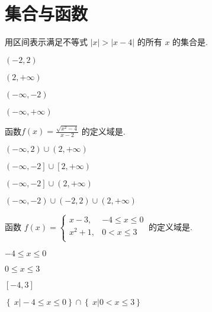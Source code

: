 \chapter{集合与函数}



\begin{problem}
	用区间表示满足不等式 $|x| > |x - 4|$ 的所有 $x$ 的集合是.
	
	
\begin{abcd} 
		\item $\left( - 2,2 \right)$
		
		\item $\left( 2, + \infty \right)$
		
		\item $\left( - \infty, - 2 \right)$
		
		\item $\left( - \infty, + \infty \right)$
\end{abcd}  
\end{problem}

\begin{problem}	
函数$\displaystyle f\left( x \right) = \frac{\sqrt{x^{2} - 4}}{x - 2}$ 的定义域是.
	
	
	\begin{abcd} \item $\left( - \infty,2 \right) \cup \left( 2, + \infty \right)$
		
		\item
		$\left( - \infty, - 2 \right\rbrack \cup \left\lbrack 2, + \infty \right)$
		
		\item
		$\left( - \infty, - 2 \right\rbrack \cup \left( 2, + \infty \right)$
		
		\item
		$\left( - \infty, - 2 \right) \cup \left( - 2,2 \right) \cup \left( 2, + \infty \right)$
		
		
\end{abcd}  
\end{problem}

\begin{problem}
	函数
	$f\left( x \right) = \left\{ \begin{matrix}
	x - 3, & - 4 \leq x \leq 0 \\
	x^{2} + 1, & 0 < x \leq 3 \\
	\end{matrix} \right.\ $的定义域是.
	
	
	\begin{abcd} \item $- 4 \leq x \leq 0$
		
		\item $0 \leq x \leq 3$
		
		\item $\left\lbrack - 4,3 \right\rbrack$
		
		\item
		$\left\{ \left. \ x \right| - 4 \leq x \leq 0 \right\} \cap \left\{ \left. \ x \right|0 < x \leq 3 \right\}$
		\end{abcd}
		
		\end{problem} 


